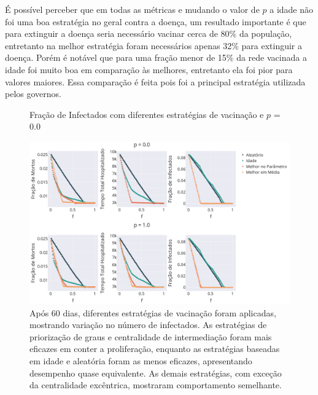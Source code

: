 É possível perceber que em todas as métricas e mudando o valor de $p$ a idade não foi uma boa estratégia no geral contra a doença, um resultado importante é que para extinguir a doença seria necessário vacinar cerca de 80\% da população, entretanto na melhor estratégia foram necessários apenas 32\% para extinguir a doença. Porém é notável que para uma fração menor de 15\% da rede vacinada a idade foi muito boa em comparação às melhores, entretanto ela foi pior para valores maiores. Essa comparação é feita pois foi a principal estratégia utilizada pelos governos.

\begin{figure}[H]
    \centering
    \captionsetup{font=normalsize,skip=0.8pt,singlelinecheck=on,labelsep=endash}
    \caption{Fração de Infectados com diferentes estratégias de vacinação e $p$ = 0.0}
    \includegraphics[scale= 0.3]{figuras/cmpara_p_f.png}
    \captionsetup{font=small,justification=justified}
    
    \caption*{ Após 60 dias, diferentes estratégias de vacinação foram aplicadas, mostrando variação no número de infectados. As estratégias de priorização de graus e centralidade de intermediação foram mais eficazes em conter a proliferação, enquanto as estratégias baseadas em idade e aleatória foram as menos eficazes, apresentando desempenho quase equivalente. As demais estratégias, com exceção da centralidade excêntrica, mostraram comportamento semelhante.}
    \label{fig:resultados_metricas}
\end{figure}

